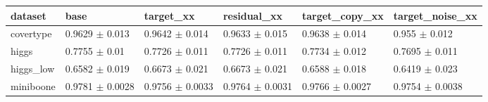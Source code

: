 \begin{tabular}{llllll}
\toprule
dataset & base & target\_xx & residual\_xx & target\_copy\_xx & target\_noise\_xx \\
\midrule
covertype & 0.9629 $\pm$ 0.013 & 0.9642 $\pm$ 0.014 & 0.9633 $\pm$ 0.015 & 0.9638 $\pm$ 0.014 & 0.955 $\pm$ 0.012 \\
higgs & 0.7755 $\pm$ 0.01 & 0.7726 $\pm$ 0.011 & 0.7726 $\pm$ 0.011 & 0.7734 $\pm$ 0.012 & 0.7695 $\pm$ 0.011 \\
higgs\_low & 0.6582 $\pm$ 0.019 & 0.6673 $\pm$ 0.021 & 0.6673 $\pm$ 0.021 & 0.6588 $\pm$ 0.018 & 0.6419 $\pm$ 0.023 \\
miniboone & 0.9781 $\pm$ 0.0028 & 0.9756 $\pm$ 0.0033 & 0.9764 $\pm$ 0.0031 & 0.9766 $\pm$ 0.0027 & 0.9754 $\pm$ 0.0038 \\
\bottomrule
\end{tabular}
